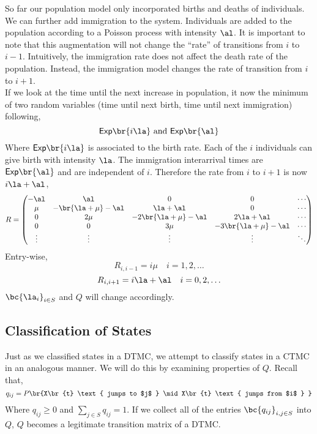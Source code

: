 \documentclass{article}
\newcommand{\Ex}{\mathsf{Exp}}
\begin{document}
    So far our population model only incorporated births and deaths of individuals. We can further add immigration to the system. Individuals are added to the population according to a Poisson process with intensity $\al$. It is important to note that this augmentation will not change the ``rate'' of transitions from $i$ to $i-1$. Intuitively, the immigration rate does not affect the death rate of the population. Instead, the immigration model changes the rate of transition from $i$ to $i + 1$. \\

    If we look at the time until the next increase in population, it now the minimum of two random variables (time until next birth, time until next immigration) following,
    \[ \Ex\br{i \la} \text{ and } \Ex\br{\al} \]
    Where $\Ex\br{i \la}$ is associated to the birth rate. Each of the $i$ individuals can give birth with intensity $\la$. The immigration interarrival times are $\Ex\br{\al}$ and are independent of $i$. Therefore the rate from $i$ to $i+1$ is now $i \la + \al$,
    \[ R = \begin{pmatrix}
        -\al & \al & 0 & 0 & \cdots \\
        \mu & -\br{\la+\mu}-\al & \la + \al & 0 & \cdots \\
        0 & 2\mu & -2\br{\la+\mu}-\al & 2\la + \al & \cdots \\
        0 & 0 & 3 \mu & -3\br{\la+\mu}-\al & \cdots \\
        \vdots & \vdots & \vdots & \vdots & \ddots \\
    \end{pmatrix} \]
    Entry-wise,
    \[ R_{i, i-1} = i \mu \quad i = 1,2,\ldots \]
    \[ R_{i, i+1} = i \la + \al \quad i = 0,2,\ldots \]
    $\bc{\la_i}_{i \in S}$ and $Q$ will change accordingly.

    \subsection{Classification of States}

    Just as we classified states in a DTMC, we attempt to classify states in a CTMC in an analogous manner. We will do this by examining properties of $Q$. Recall that,
    \[ q_{ij} = P\br{X\br{t} \text{ jumps to $j$ } \mid X\br{t} \text{ jumps from $i$ } } \]
    Where $q_{ij} \geq 0$ and $\sum_{j\in S} q_{ij} = 1$. If we collect all of the entries $\bc{q_{ij}}_{i,j\in S}$ into $Q$, $Q$ becomes a legitimate transition matrix of a DTMC. \\
\end{document}
